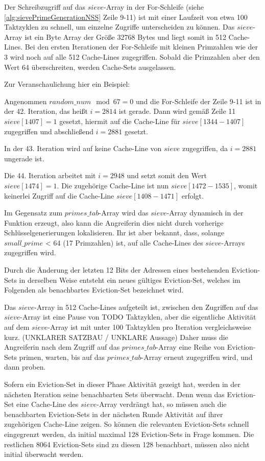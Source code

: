 Der Schreibzugriff auf das $sieve$-Array in der For-Schleife (siehe \ref{alg:sievePrimeGenerationNSS} Zeile 9-11) ist mit einer Laufzeit von etwa 100 Taktzyklen zu schnell, um einzelne Zugriffe unterscheiden zu können.
Das $sieve$-Array ist ein Byte Array der Größe 32768 Bytes und liegt somit in 512 Cache-Lines.
Bei den ersten Iterationen der For-Schleife mit kleinen Primzahlen wie der 3 wird noch auf alle 512 Cache-Lines zugegriffen.
Sobald die Primzahlen aber den Wert 64 überschreiten, werden Cache-Sets ausgelassen.

Zur Veranschaulichung hier ein Beispiel:

Angenommen $random\_num \mod 67 = 0$ und die For-Schleife der Zeile 9-11 ist in der 42. Iteration, das heißt $i=2814$ ist gerade.
Dann wird gemäß Zeile 11 $sieve[1407] = 1$ gesetzt, hiermit auf die Cache-Line für $sieve[1344-1407]$ zugegriffen und abschließend $i=2881$ gesetzt.

In der 43. Iteration wird auf keine Cache-Line von $sieve$ zugegriffen, da $i=2881$ ungerade ist.

Die 44. Iteration arbeitet mit $i=2948$ und setzt somit den Wert $sieve[1474] = 1$.
Die zugehörige Cache-Line ist nun $sieve[1472-1535]$, womit keinerlei Zugriff auf die Cache-Line $sieve[1408-1471]$ erfolgt.

Im Gegensatz zum $primes\_tab$-Array wird das $sieve$-Array dynamisch in der Funktion erzeugt, also kann die Angreiferin dies nicht durch vorherige Schlüsselgenerierungen lokalisieren.
Ihr ist aber bekannt, dass, solange $small\_prime$ < 64 (17 Primzahlen) ist, auf alle Cache-Lines des $sieve$-Arrays zugegriffen wird.

Durch die Änderung der letzten 12 Bits der Adressen eines bestehenden Eviction-Sets in derselben Weise entsteht ein neues gültiges Eviction-Set, welches im Folgenden als benachbartes Eviction-Set bezeichnet wird.

Das $sieve$-Array in 512 Cache-Lines aufgeteilt ist, zwischen den Zugriffen auf das $sieve$-Array ist eine Pause von TODO Taktzyklen, aber die eigentliche Aktivität auf dem $sieve$-Array ist mit unter 100 Taktzyklen pro Iteration vergleichsweise kurz. (UNKLARER SATZBAU / UNKLARE Aussage)
Daher muss die Angreiferin nach dem Zugriff auf das $primes\_tab$-Array eine Reihe von Eviction-Sets primen, warten, bis auf das $primes\_tab$-Array erneut zugegriffen wird, und dann proben.

Sofern ein Eviction-Set in dieser Phase Aktivität gezeigt hat, werden in der nächsten Iteration seine benachbarten Sets überwacht.
Denn wenn das Eviction-Set eine Cache-Line des $sieve$-Array verdrängt hat, so müssen auch die benachbarten Eviction-Sets in der nächsten Runde Aktivität auf ihrer zugehörigen Cache-Line zeigen.
So können die relevanten Eviction-Sets schnell eingegrenzt werden, da initial maximal 128 Eviction-Sets in Frage kommen.
Die restlichen 8064 Eviction-Sets sind zu diesen 128 benachbart, müssen also nicht initial überwacht werden.

